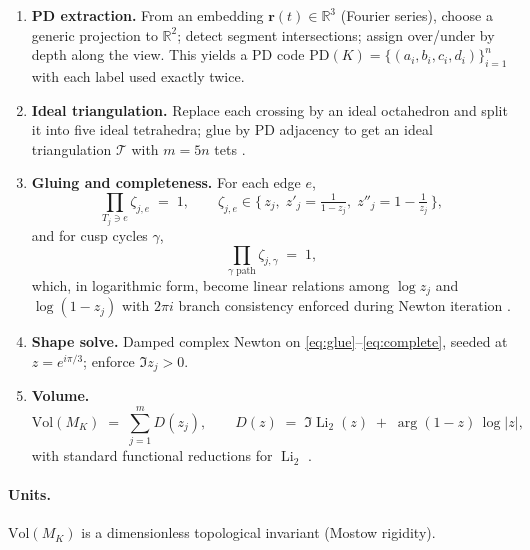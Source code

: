 \documentclass[10pt,reprint,aps,onecolumn,nofootinbib]{revtex4-2}
\begin{document}
        \begin{enumerate}
            \item \textbf{PD extraction.} From an embedding \( \mathbf{r}(t)\in\mathbb{R}^3 \) (Fourier series), choose a generic projection to \(\mathbb{R}^2\); detect segment intersections; assign over/under by depth along the view. This yields a PD code \(\mathrm{PD}(K)=\{(a_i,b_i,c_i,d_i)\}_{i=1}^n\) with each label used exactly twice.
            \item \textbf{Ideal triangulation.} Replace each crossing by an ideal octahedron and split it into five ideal tetrahedra; glue by PD adjacency to get an ideal triangulation \(\mathcal{T}\) with \(m=5n\) tets \cite{ThurstonNotes,AdamsWeeks1992}.
            \item \textbf{Gluing and completeness.} For each edge \(e\),
            \begin{equation}
                \prod_{T_j\ni e} \zeta_{j,e} \;=\; 1,
                \qquad
                \zeta_{j,e}\in\{\,z_j,\; z'_j=\tfrac{1}{1-z_j},\; z''_j=1-\tfrac{1}{z_j}\,\},
                \label{eq:glue}
            \end{equation}
            and for cusp cycles \(\gamma\),
            \begin{equation}
                \prod_{\gamma\text{ path}} \zeta_{j,\gamma} \;=\; 1,
                \label{eq:complete}
            \end{equation}
            which, in logarithmic form, become linear relations among \(\log z_j\) and \(\log(1-z_j)\) with \(2\pi i\) branch consistency enforced during Newton iteration \cite{NeumannZagier1985}.
            \item \textbf{Shape solve.} Damped complex Newton on \eqref{eq:glue}–\eqref{eq:complete}, seeded at \(z=e^{i\pi/3}\); enforce \(\Im z_j>0\).
            \item \textbf{Volume.}
            \begin{equation}
                \mathrm{Vol}(M_K) \;=\; \sum_{j=1}^m D(z_j),
                \qquad
                D(z) \;=\; \Im\!\operatorname{Li}_2(z) \;+\; \arg(1-z)\,\log|z|,
                \label{eq:BW}
            \end{equation}
            with standard functional reductions for \(\operatorname{Li}_2\) \cite{Lewin1981,NeumannZagier1985}.
        \end{enumerate}

        \paragraph{Units.} \(\mathrm{Vol}(M_K)\) is a dimensionless topological invariant (Mostow rigidity).
\end{document}
